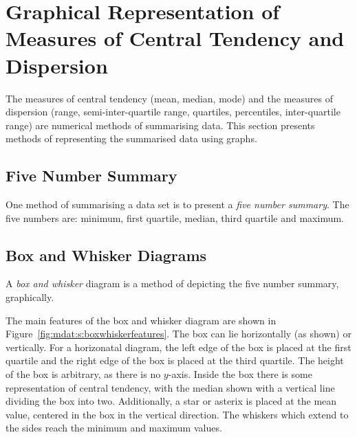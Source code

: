 \section[Graphical Representation of Measures of Central Tendency and Dispersion]{\Huge Graphical Representation of Measures of Central Tendency and Dispersion}

The measures of central tendency (mean, median, mode) and the measures of dispersion (range, semi-inter-quartile range, quartiles, percentiles, inter-quartile range) are numerical methods of summarising data. This section presents methods of representing the summarised data using graphs.

\subsection{Five Number Summary}
One method of summarising a data set is to present a \textit{five number summary}. The five numbers are: minimum, first quartile, median, third quartile and maximum.

\subsection{Box and Whisker Diagrams}
A \textit{box and whisker} diagram is a method of depicting the five number summary, graphically.

The main features of the box and whisker diagram are shown in Figure~\ref{fig:mdat:s:boxwhiskerfeatures}. The box can lie horizontally (as shown) or vertically. For a horizonatal diagram, the left edge of the box is placed at the first quartile and the right edge of the box is placed at the third quartile. The height of the box is arbitrary, as there is no $y$-axis. Inside the box there is some representation of central tendency, with the median shown with a vertical line dividing the box into two. Additionally, a star or asterix is placed at the mean value, centered in the box in the vertical direction. The whiskers which extend to the sides reach the minimum and maximum values.

